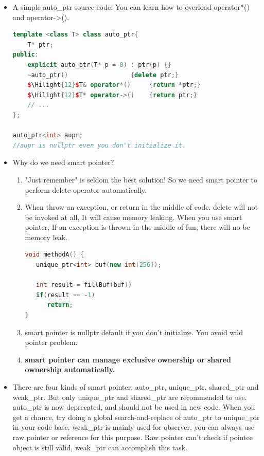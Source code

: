 \documentclass[a4paper,12pt,twoside]{book}
\newcommand{\Hilight}[1]{\makebox[0pt][l]{\color{yellow}\rule[-3pt]{#1em}{11pt}}}
\begin{document}
\begin{itemize}
\item A simple auto\_ptr source code: You can learn how to overload operator*() and operator->().
\begin{lstlisting}[frame=single, language=c++, mathescape=true]
template <class T> class auto_ptr{
    T* ptr;
public:
    explicit auto_ptr(T* p = 0) : ptr(p) {}
    ~auto_ptr()                 {delete ptr;}
    $\Hilight{12}$T& operator*()     {return *ptr;}
    $\Hilight{12}$T* operator->()    {return ptr;}
    // ...
};

auto_ptr<int> aupr;
//aupr is nullptr even you don't initialize it.
\end{lstlisting}

\item Why do we need smart pointer?
\begin{enumerate}
\item "Just remember" is seldom the best solution! So we need smart pointer to perform delete operator automatically.

\item When throw an exception, or return in the middle of code. delete will not be invoked at all, It will cause memory leaking. When you use smart pointer, If an exception is thrown in the middle of fun, there will no be memory leak.
\begin{lstlisting}[frame=single, language=c++]
void methodA() {
   unique_ptr<int> buf(new int[256]);

   int result = fillBuf(buf))
   if(result == -1)
      return;
}
\end{lstlisting}

\item smart pointer is nullptr default if you don't initialize. You avoid wild pointer problem.
\item \textbf{smart pointer can manage exclusive ownership or shared ownership automatically. }
\end{enumerate}

\item There are four kinds of smart pointer: auto\_ptr, unique\_ptr, shared\_ptr and weak\_ptr.  But only unique\_ptr and shared\_ptr are recommended to use. auto\_ptr is now deprecated, and should not be used in new code. When you get a chance, try doing a global search-and-replace of auto\_ptr to unique\_ptr in your code base. weak\_ptr is mainly used for observer, you can always use raw pointer or reference for this purpose. Raw pointer can't check if pointee object is still valid, weak\_ptr can accomplish this task.


\end{itemize}
\end{document}

